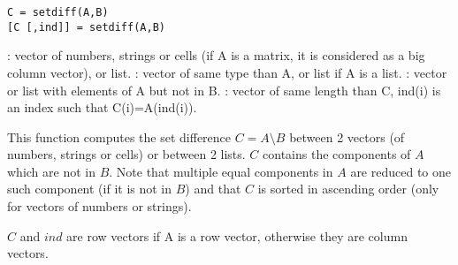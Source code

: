 
\begin{mandesc}
\end{mandesc}

\begin{calling_sequence}
\begin{verbatim}
C = setdiff(A,B)
[C [,ind]] = setdiff(A,B)
\end{verbatim}
\end{calling_sequence}
\begin{parameters}
  \begin{varlist}
    : vector of numbers, strings or cells (if A is a matrix, it is
    considered as a big column vector), or list.
    : vector of same type than A, or list if A is a list. 
    : vector or list with elements of A but not in B.
    : vector of same length than C, ind(i) is an index
                  such that C(i)=A(ind(i)).
  \end{varlist}
\end{parameters}

\begin{mandescription}
  This function computes the set difference $C = A \setminus B$
  between 2 vectors (of numbers, strings or cells) or between 2
  lists. $C$ contains the components
  of $A$ which are not in $B$. Note that multiple equal components in
  $A$ are reduced to one such component (if it is not in $B$) and that
  $C$ is sorted in ascending order (only for vectors of numbers or strings).

  $C$ and $ind$ are row vectors if  A is a row vector, otherwise they
  are column vectors.
  
\end{mandescription}

